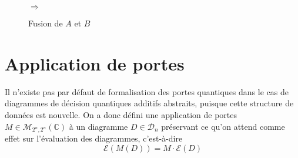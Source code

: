 \begin{multicols}{2}
  \columnbreak
  \begin{figure}[H]
    \centering
  $\Rightarrow$
  \caption{Fusion de $A$ et $B$}
  \label{fig:exemple_fusion}
  \end{figure}

  \end{multicols}

\section{Application de portes}
\label{sec:Portes}

Il n'existe pas par défaut de formalisation des portes quantiques dans le cas de diagrammes de décision quantiques additifs abstraits, puisque cette structure de données est nouvelle. On a donc défini une application de portes $M \in \mathcal M_{2^n, 2^n}(\mathbb C)$ à un diagramme $D \in \mathcal D_n$ préservant ce qu'on attend comme effet sur l'évaluation des diagrammes, c'est-à-dire
$$\mathcal E(M(D)) = M \cdot \mathcal E(D)$$

